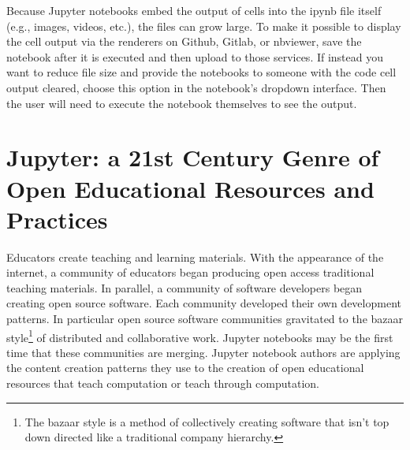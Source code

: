 \documentclass[]{book}
\let\rmarkdownfootnote\footnote%
\def\footnote{\protect\rmarkdownfootnote}
\begin{document}
Because Jupyter notebooks embed the output of cells into the ipynb file
itself (e.g., images, videos, etc.), the files can grow large. To make
it possible to display the cell output via the renderers on Github,
Gitlab, or nbviewer, save the notebook after it is executed and then
upload to those services. If instead you want to reduce file size and
provide the notebooks to someone with the code cell output cleared,
choose this option in the notebook's dropdown interface. Then the user
will need to execute the notebook themselves to see the output.

\section{Jupyter: a 21st Century Genre of Open Educational Resources and
Practices}\label{jupyter-a-21st-century-genre-of-open-educational-resources-and-practices}

Educators create teaching and learning materials. With the appearance of
the internet, a community of educators began producing open access
traditional teaching materials. In parallel, a community of software
developers began creating open source software. Each community developed
their own development patterns. In particular open source software
communities gravitated to the bazaar style\footnote{The bazaar style is
  a method of collectively creating software that isn't top down
  directed like a traditional company hierarchy.} of distributed and
collaborative work. Jupyter notebooks may be the first time that these
communities are merging. Jupyter notebook authors are applying the
content creation patterns they use to the creation of open educational
resources that teach computation or teach through computation.
\end{document}
